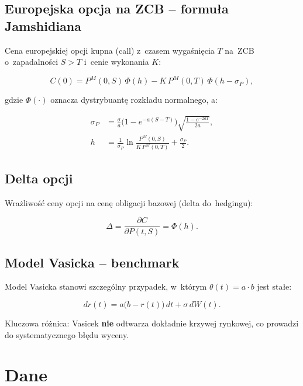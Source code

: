 \documentclass[12pt,a4paper]{article}
\begin{document}
\subsection{Europejska opcja na ZCB -- formuła Jamshidiana}

Cena europejskiej opcji kupna (call) z~czasem wygaśnięcia $T$ na~ZCB
o~zapadalności $S > T$ i~cenie wykonania $K$:

\begin{equation}
  \label{eq:call}
  C(0) = P^M(0,S)\,\Phi(h) - K\,P^M(0,T)\,\Phi(h - \sigma_P),
\end{equation}

gdzie $\Phi(\cdot)$ oznacza dystrybuantę rozkładu normalnego, a:

\begin{align}
  \sigma_P &= \frac{\sigma}{a}\bigl(1 - e^{-a(S-T)}\bigr)
              \sqrt{\frac{1 - e^{-2aT}}{2a}}, \label{eq:sigma_p}\\[6pt]
  h &= \frac{1}{\sigma_P}\ln\frac{P^M(0,S)}{K\,P^M(0,T)}
       + \frac{\sigma_P}{2}. \label{eq:h}
\end{align}

\subsection{Delta opcji}

Wrażliwość ceny opcji na cenę obligacji bazowej (delta do~hedgingu):

\begin{equation}
  \label{eq:delta}
  \Delta = \frac{\partial C}{\partial P(t,S)} = \Phi(h).
\end{equation}

\subsection{Model Vasicka -- benchmark}

Model Vasicka stanowi szczególny przypadek, w~którym $\theta(t) = a\cdot b$
jest stałe:

\begin{equation}
  dr(t) = a\bigl(b - r(t)\bigr)\,dt + \sigma\,dW(t).
\end{equation}

Kluczowa różnica: Vasicek \textbf{nie} odtwarza dokładnie krzywej rynkowej,
co prowadzi do systematycznego błędu wyceny.

\section{Dane}
\label{sec:data}
\end{document}
